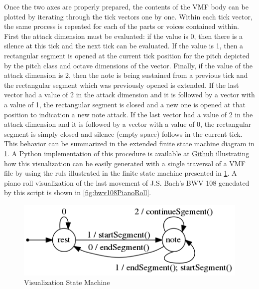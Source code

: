 Once the two axes are properly prepared, the contents of the VMF body can be plotted by iterating through the tick vectors one by one. Within each tick vector, the same process is repeated for each of the parts or voices contained within. First the attack dimension must be evaluated: if the value is 0, then there is a silence at this tick and the next tick can be evaluated. If the value is 1, then a rectangular segment is opened at the current tick position for the pitch depicted by the pitch class and octave dimensions of the vector. Finally, if the value of the attack dimension is 2, then the note is being sustained from a previous tick and the rectangular segment which was previously opened is extended. If the last vector had a value of 2 in the attack dimension and it is followed by a vector with a value of 1, the rectangular segment is closed and a new one is opened at that position to indication a new note attack. If the last vector had a value of 2 in the attack dimension and it is followed by a vector with a value of 0, the rectangular segment is simply closed and silence (empty space) follows in the current tick. This behavior can be summarized in the extended finite state machine diagram in \ref{fig:visualizationStateMachine}. A Python implementation of this procedure is available at \href{https://github.com/project-schumann/vmf-visualization}{Github} illustrating how this visualization can be easily generated with a single traversal of a VMF file by using the ruls illustrated in the finite state machine presented in \ref{fig:visualizationStateMachine}. A piano roll visualization of the last movement of J.S. Bach's BWV 108 genedated by this script is shown in \ref{fig:bwv108PianoRoll}.

\begin{figure}
  \begin{center}
    \includegraphics[scale=0.75]{resources/visualizationFSM}
    \caption{Visualization State Machine}
    \label{fig:visualizationStateMachine}
  \end{center}
\end{figure}

